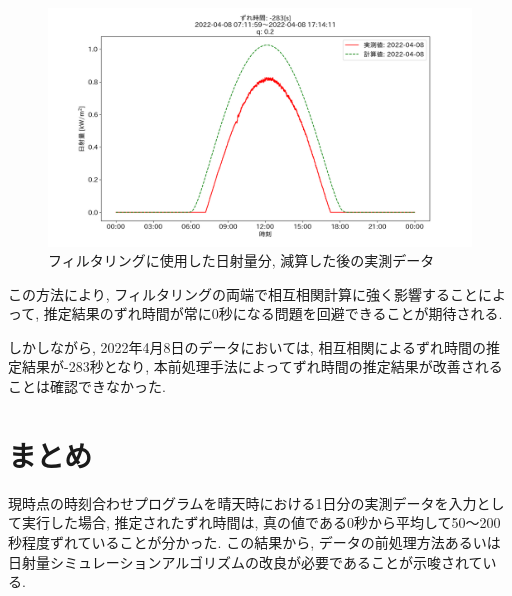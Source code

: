 \documentclass[a4j,12pt,]{jarticle}
\begin{document}
\begin{figure}[H]
  \begin{center}
    \includegraphics[width=160mm]{2022-04-08_mask_by_q_corr.png}
    \caption{フィルタリングに使用した日射量分, 減算した後の実測データ}
    \label{p10}
  \end{center}
\end{figure}

この方法により, フィルタリングの両端で相互相関計算に強く影響することによって, 推定結果のずれ時間が常に0秒になる問題を回避できることが期待される.

しかしながら, 2022年4月8日のデータにおいては, 相互相関によるずれ時間の推定結果が-283秒となり, 本前処理手法によってずれ時間の推定結果が改善されることは確認できなかった.

\section{まとめ}
現時点の時刻合わせプログラムを晴天時における1日分の実測データを入力として実行した場合, 推定されたずれ時間は, 真の値である0秒から平均して50〜200秒程度ずれていることが分かった. この結果から, データの前処理方法あるいは日射量シミュレーションアルゴリズムの改良が必要であることが示唆されている.

\end{document}

